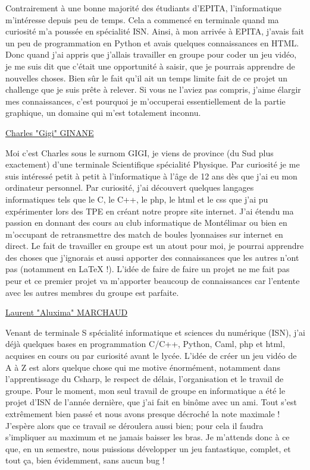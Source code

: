 \documentclass[a4paper , 12pt]{article}
\begin{document}
\quad

Contrairement à une bonne majorité des étudiants d’EPITA, l’informatique m’intéresse depuis peu de temps. Cela a commencé en terminale quand ma curiosité m’a poussée en spécialité ISN. Ainsi, à mon arrivée à EPITA, j’avais fait un peu de programmation en Python et avais quelques connaissances en HTML. Donc quand j’ai appris que j’allais travailler en groupe pour coder un jeu vidéo, je me suis dit que c’était une opportunité à saisir, que je pourrais apprendre de nouvelles choses. Bien sûr le fait qu’il ait un temps limite fait de ce projet un challenge que je suis prête à relever. Si vous ne l'aviez pas compris, j’aime élargir mes connaissances, c’est pourquoi je m’occuperai essentiellement de la partie graphique, un domaine qui m’est totalement inconnu.

\quad

		\underline{Charles "Gigi" GINANE}
			
\quad

Moi c’est Charles sous le surnom GIGI, je viens de province (du Sud plus exactement) d’une terminale Scientifique spécialité Physique. Par curiosité je me suis intéressé petit à petit à l’informatique à l’âge de 12 ans dès que j’ai eu mon ordinateur personnel.
Par curiosité, j’ai découvert quelques langages informatiques tels que le C, le C++, le php, le html et le css que j’ai pu expérimenter lors des TPE en créant notre propre site internet.
J’ai étendu ma passion en donnant des cours au club informatique de Montélimar ou bien en m’occupant de retransmettre des match de boules lyonnaises sur internet en direct.
Le fait de travailler en groupe est un atout pour moi, je pourrai apprendre des choses que j’ignorais et aussi apporter des connaissances que les autres n’ont pas (notamment en LaTeX !).
L’idée de faire de faire un projet ne me fait pas peur et ce premier projet va m’apporter beaucoup de connaissances car l’entente avec les autres membres du groupe est parfaite.

\newpage

		\underline{Laurent "Aluxima" MARCHAUD}

\quad

Venant de terminale S spécialité informatique et sciences du numérique (ISN), j’ai déjà quelques bases en programmation C/C++, Python, Caml, php et html, acquises en cours ou par curiosité avant le lycée. L’idée de créer un jeu vidéo de A à Z est alors quelque chose qui me motive énormément, notamment dans l’apprentissage du Csharp, le respect de délais, l’organisation et le travail de groupe. Pour le moment, mon seul travail de groupe en informatique a été le projet d’ISN de l’année dernière, que j’ai fait en binôme avec un ami. Tout s’est extrêmement bien passé et nous avons presque décroché la note maximale ! J’espère alors que ce travail se déroulera aussi bien; pour cela il faudra s’impliquer au maximum et ne jamais baisser les bras.
Je m’attends donc à ce que, en un semestre, nous puissions développer un jeu fantastique, complet, et tout ça, bien évidemment, sans aucun bug !
\end{document}
